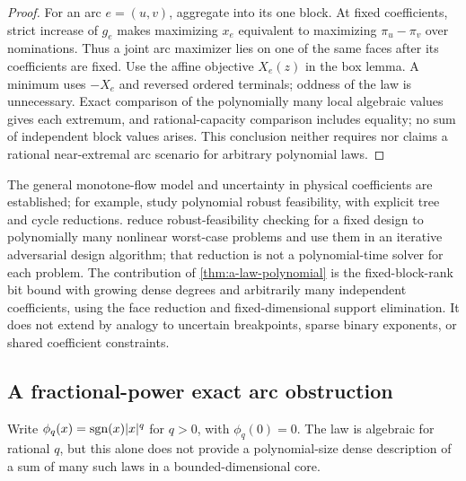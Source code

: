 \begin{proof}
For an arc $e=(u,v)$, aggregate into its one block. At fixed coefficients,
strict increase of $g_e$ makes maximizing $x_e$ equivalent to maximizing
$\pi_u-\pi_v$ over nominations. Thus a joint arc maximizer lies on
one of the same faces after its coefficients are fixed. Use the affine
objective $X_e(z)$ in the box lemma. A minimum uses $-X_e$ and reversed
ordered terminals; oddness of the law is unnecessary. Exact comparison
of the polynomially many local algebraic values gives each extremum,
and rational-capacity comparison includes equality; no sum of
independent block values arises. This conclusion neither requires nor
claims a rational near-extremal arc scenario for arbitrary polynomial laws.
\end{proof}

The general monotone-flow model and uncertainty in physical coefficients
are established; for example, \citet[Sections 3 and 4]{amann2018-deciding-robust-feasibility-and-infeasibility}
study polynomial robust feasibility, with explicit tree and cycle
reductions. \citet[Sections 1 and 3]{thurauf2025-adjustable-robust-nonlinear-network-design}
reduce robust-feasibility checking for a fixed design to polynomially many
nonlinear worst-case problems and use them in an iterative adversarial
design algorithm; that reduction is not a polynomial-time solver for
each problem. The contribution of \cref{thm:a-law-polynomial} is the fixed-block-rank
bit bound with growing dense degrees and arbitrarily many independent
coefficients, using the face reduction and fixed-dimensional support
elimination. It does not extend by analogy to uncertain breakpoints,
sparse binary exponents, or shared coefficient constraints.

\subsection{A fractional-power exact arc obstruction}
Write $\phi_q(x)=\operatorname{sgn}(x)|x|^q$ for $q>0$, with $\phi_q(0)=0$.
The law is algebraic for rational $q$, but this alone does not provide
a polynomial-size dense description of a sum of many such laws in a
bounded-dimensional core.

